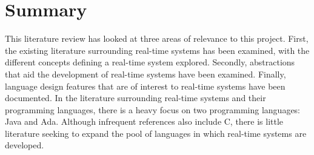 \section{Summary}
This literature review has looked at three areas of relevance to this project.
First, the existing literature surrounding real-time systems has been examined,
with the different concepts defining a real-time system explored. Secondly,
abstractions that aid the development of real-time systems have been examined.
Finally, language design features that are of interest to real-time systems
have been documented. In the literature surrounding real-time systems and their
programming languages, there is a heavy focus on two
programming languages: Java and Ada. Although infrequent references also include C, 
there is little literature seeking to expand the pool of languages in which 
real-time systems are developed. 
